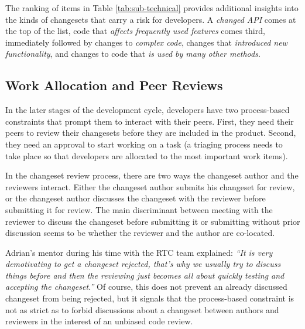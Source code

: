 The ranking of items in Table \ref{tab:sub-technical} provides additional insights into the kinds of changesets that carry a risk for developers. A \emph{changed API} comes at the top of the list, code that \emph{affects frequently used features} comes third, immediately followed by changes to \emph{complex code}, changes that \emph{introduced new functionality}, and changes to code that \emph{is used by many other methods}.






\subsection{Work Allocation and Peer Reviews}

In the later stages of the development cycle, developers have two process-based constraints that prompt them to interact with their peers. First, they need their peers to review their changesets before they are included in the product. Second, they need an approval to start working on a task (a triaging process needs to take place so that developers are allocated to the most important work items).

In the changeset review process, there are two ways the changeset author and the reviewers interact.
Either the changeset author submits his changeset for review, or the changeset author discusses the changeset with the reviewer before submitting it for review. The main discriminant between meeting with the reviewer to discuss the changeset before submitting it or submitting without prior discussion seems to be whether the reviewer and the author are co-located.

Adrian's mentor during his time with the RTC team explained: \emph{``It is very demotivating to get a changeset rejected, that's why we usually try to discuss things before and then the reviewing just becomes all about quickly testing and accepting the changeset.''} Of course, this does not prevent an already discussed changeset from being rejected, but it signals that the process-based constraint is not as strict as to forbid discussions about a changeset between authors and reviewers in the interest of an unbiased code review.

